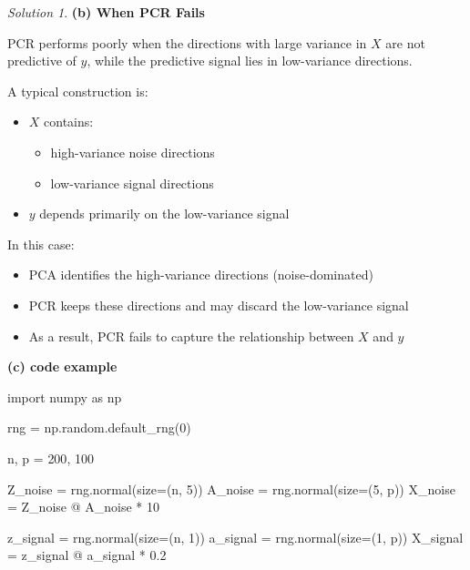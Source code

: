 \documentclass[
  english,
]{article}
\newenvironment{Shaded}{\begin{snugshade}}{\end{snugshade}}
\newcommand{\DecValTok}[1]{\textcolor[rgb]{0.68,0.00,0.00}{#1}}
\newcommand{\FloatTok}[1]{\textcolor[rgb]{0.68,0.00,0.00}{#1}}
\newcommand{\ImportTok}[1]{\textcolor[rgb]{0.00,0.46,0.62}{#1}}
\newcommand{\NormalTok}[1]{\textcolor[rgb]{0.00,0.23,0.31}{#1}}
\newcommand{\OperatorTok}[1]{\textcolor[rgb]{0.37,0.37,0.37}{#1}}
\providecommand{\tightlist}{%
  \setlength{\itemsep}{0pt}\setlength{\parskip}{0pt}}
\theoremstyle{definition}
\theoremstyle{definition}
\theoremstyle{remark}
\newtheorem*{solution}{Solution}
\begin{document}
\begin{solution}
\textbf{(b) When PCR Fails}

PCR performs poorly when the directions with large variance in \(X\) are
not predictive of \(y\), while the predictive signal lies in
low-variance directions.

A typical construction is:

\begin{itemize}
\tightlist
\item
  \(X\) contains:

  \begin{itemize}
  \tightlist
  \item
    high-variance noise directions
  \item
    low-variance signal directions
  \end{itemize}
\item
  \(y\) depends primarily on the low-variance signal
\end{itemize}

In this case:

\begin{itemize}
\tightlist
\item
  PCA identifies the high-variance directions (noise-dominated)
\item
  PCR keeps these directions and may discard the low-variance signal
\item
  As a result, PCR fails to capture the relationship between \(X\) and
  \(y\)
\end{itemize}

\textbf{(c) code example}

\begin{Shaded}
\begin{Highlighting}[]
\ImportTok{import}\NormalTok{ numpy }\ImportTok{as}\NormalTok{ np}

\NormalTok{rng }\OperatorTok{=}\NormalTok{ np.random.default\_rng(}\DecValTok{0}\NormalTok{)}

\NormalTok{n, p }\OperatorTok{=} \DecValTok{200}\NormalTok{, }\DecValTok{100}

\NormalTok{Z\_noise }\OperatorTok{=}\NormalTok{ rng.normal(size}\OperatorTok{=}\NormalTok{(n, }\DecValTok{5}\NormalTok{))}
\NormalTok{A\_noise }\OperatorTok{=}\NormalTok{ rng.normal(size}\OperatorTok{=}\NormalTok{(}\DecValTok{5}\NormalTok{, p))}
\NormalTok{X\_noise }\OperatorTok{=}\NormalTok{ Z\_noise }\OperatorTok{@}\NormalTok{ A\_noise }\OperatorTok{*} \DecValTok{10}

\NormalTok{z\_signal }\OperatorTok{=}\NormalTok{ rng.normal(size}\OperatorTok{=}\NormalTok{(n, }\DecValTok{1}\NormalTok{))}
\NormalTok{a\_signal }\OperatorTok{=}\NormalTok{ rng.normal(size}\OperatorTok{=}\NormalTok{(}\DecValTok{1}\NormalTok{, p))}
\NormalTok{X\_signal }\OperatorTok{=}\NormalTok{ z\_signal }\OperatorTok{@}\NormalTok{ a\_signal }\OperatorTok{*} \FloatTok{0.2}


\end{Highlighting}
\end{Shaded}
\end{solution}
\end{document}
